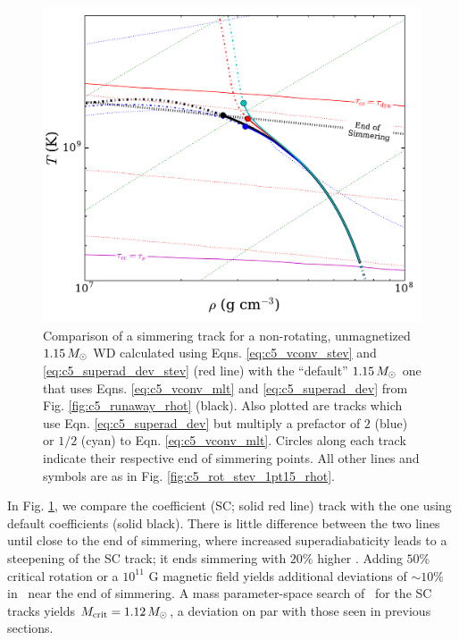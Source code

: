 


\begin{figure}
\centering
\includegraphics[angle=0,width=0.8\columnwidth]{chapter5_zhu+16/figures/diag_1pt15_rhot.pdf}
\caption{Comparison of a simmering track for a non-rotating, unmagnetized $1.15\,\Msun$ WD calculated using Eqns. \ref{eq:c5_vconv_stev} and \ref{eq:c5_superad_dev_stev} (red line) with the ``default'' $1.15\,\Msun$ one that uses Eqns. \ref{eq:c5_vconv_mlt} and \ref{eq:c5_superad_dev} from Fig. \ref{fig:c5_runaway_rhot} (black).  Also plotted are tracks which use Eqn. \ref{eq:c5_superad_dev} but multiply a prefactor of $2$ (blue) or $1/2$ (cyan) to Eqn. \ref{eq:c5_vconv_mlt}.  Circles along each track indicate their respective end of simmering points.  All other lines and symbols are as in Fig. \ref{fig:c5_rot_stev_1pt15_rhot}.}
\label{fig:c5_mltcoeff_rhot}
\end{figure}

In Fig. \ref{fig:c5_mltcoeff_rhot}, we compare the \citeal{stev79} coefficient (SC; solid red line) track with the one using default coefficients (solid black).  There is little difference between the two lines until close to the end of simmering, where increased superadiabaticity leads to a steepening of the SC track; it ends simmering with $20$\% higher \rhoc.  Adding $50$\% critical rotation or a $10^{11}$ G magnetic field yields additional deviations of $\sim10$\% in \rhoc\ near the end of simmering.  A mass parameter-space search of \Mcrit\ for the SC tracks yields $\Mcrit = 1.12\,\Msun$, a deviation on par with those seen in previous sections.

